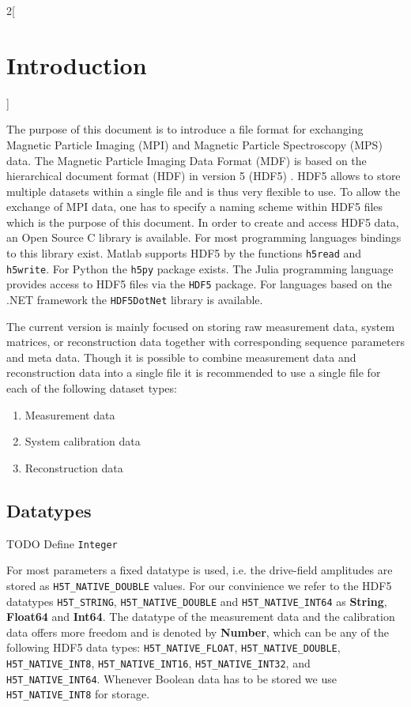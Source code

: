 \documentclass[landscape,a4paper]{article} %
\newcommand{\inl}[1]{\lstinline[columns=fixed]{#1}}
\newcommand{\inltab}[1]{{\ttfamily\bfseries\color{blue}#1}}
\begin{document}
\begin{multicols}{2}[\section{Introduction} \label{Sec:Introduction}]

The purpose of this document is to introduce a file format for exchanging Magnetic Particle Imaging (MPI) and Magnetic Particle Spectroscopy (MPS) data. The Magnetic Particle Imaging Data Format (MDF) is based on the hierarchical document format (HDF) in version 5 (HDF5) \cite{hdf5}. HDF5 allows to store multiple datasets within a single file and is thus very flexible to use. To allow the exchange of MPI data, one has to specify a naming scheme within HDF5 files which is the purpose of this document. In order to create and access HDF5 data, an Open Source C library is available. For most programming languages bindings to this library exist. Matlab supports HDF5 by the functions \inl{h5read} and \inl{h5write}. For Python the \inl{h5py} package exists. The Julia programming language provides access to HDF5 files via the \inl{HDF5} package. For languages based on the .NET framework the \inl{HDF5DotNet} library is available.

The current version is mainly focused on storing raw measurement data, system matrices, or reconstruction data together with corresponding sequence parameters and meta data. Though it is possible to combine measurement data and reconstruction data into a single file it is recommended to use a single file for each of the following dataset types:
\begin{enumerate}
\setlength{\itemsep}{0pt}
\item Measurement data
\item System calibration data
\item Reconstruction data
\end{enumerate}

\subsection{Datatypes}

TODO Define \inl{Integer}

For most parameters a fixed datatype is used, i.e. the drive-field amplitudes are stored as \inl{H5T_NATIVE_DOUBLE} values. For our convinience we refer to the HDF5 datatypes \inl{H5T_STRING}, \inl{H5T_NATIVE_DOUBLE} and \inl{H5T_NATIVE_INT64} as \inltab{String}, \inltab{Float64} and \inltab{Int64}. The datatype of the measurement data and the calibration data offers more freedom and is denoted by \inltab{Number}, which can be any of the following HDF5 data types: \inl{H5T_NATIVE_FLOAT}, \inl{H5T_NATIVE_DOUBLE}, \inl{H5T_NATIVE_INT8}, \inl{H5T_NATIVE_INT16}, \inl{H5T_NATIVE_INT32}, and \inl{H5T_NATIVE_INT64}. Whenever Boolean data has to be stored we use \inl{H5T_NATIVE_INT8} for storage.


\end{multicols}
\end{document}
